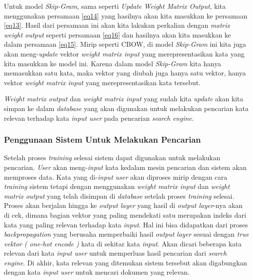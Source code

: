 \documentclass[12pt]{report}
\begin{document}
Untuk model \textit{Skip-Gram}, sama seperti \textit{Update Weight Matrix Output}, kita menggunakan persamaan \eqref{eq14} yang hasilnya akan kita masukkan ke persamaan \eqref{eq13}. Hasil dari persamaan ini akan kita lakukan perkalian dengan \textit{matrix weight output} seperti persamaan \eqref{eq16} dan hasilnya akan kita masukkan ke dalam persamaan \eqref{eq15}. Mirip seperti CBOW, di model \textit{Skip-Gram} ini kita juga akan meng-\textit{update} vektor \textit{weight matrix input} yang merepresentasikan kata yang kita masukkan ke model ini. Karena dalam model \textit{Skip-Gram} kita hanya memasukkan satu kata, maka vektor yang diubah juga hanya satu vektor, hanya vektor \textit{weight matrix input} yang merepresentasikan kata tersebut. 

\textit{Weight matrix output} dan \textit{weight matrix input} yang sudah kita \textit{update} akan kita simpan ke dalam \textit{database} yang akan digunakan untuk melakukan pencarian kata relevan terhadap kata \textit{input user} pada pencarian \textit{search engine}.

\subsubsection{Penggunaan Sistem Untuk Melakukan Pencarian}
Setelah proses \textit{training} selesai sistem dapat digunakan untuk melakukan pencarian. \textit{User} akan meng-\textit{input} kata kedalam mesin pencarian dan sistem akan memproses data. Kata yang di-\textit{input user} akan diproses mirip dengan cara \textit{training} sistem tetapi dengan menggunakan \textit{weight matrix input} dan \textit{weight matrix output} yang telah disimpan di \textit{database} setelah proses \textit{training} selesai. Proses akan berjalan hingga ke \textit{output layer} yang hasil di \textit{output layer}-nya akan di cek, dimana bagian vektor yang paling mendekati satu merupakan indeks dari kata yang paling relevan terhadap kata \textit{input}. Hal ini bisa didapatkan dari proses \textit{backpropagation} yang berusaha memperbaiki hasil \textit{output layer} sesuai dengan \textit{true vektor ( one-hot encode )} kata di sekitar kata \textit{input}. Akan dicari beberapa kata relevan dari kata \textit{input user} untuk memperluas hasil pencarian dari \textit{search engine}. Di akhir, kata relevan yang ditemukan sistem tersebut akan digabungkan dengan kata \textit{input user} untuk mencari dokumen yang relevan.
\end{document}
